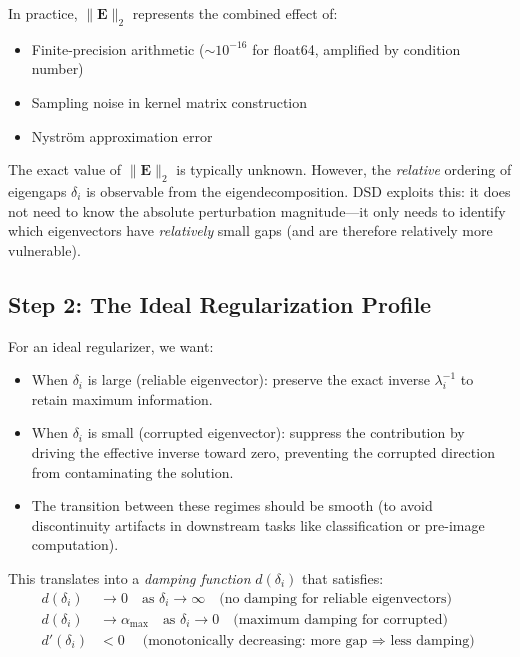 \documentclass[journal]{IEEEtran}
\begin{document}
In practice, $\|\bm{E}\|_2$ represents the combined effect of:
\begin{itemize}
\item Finite-precision arithmetic ($\sim 10^{-16}$ for float64, amplified by condition number)
\item Sampling noise in kernel matrix construction
\item Nystr\"{o}m approximation error
\end{itemize}
The exact value of $\|\bm{E}\|_2$ is typically unknown. However, the \emph{relative} ordering of eigengaps $\delta_i$ is observable from the eigendecomposition. DSD exploits this: it does not need to know the absolute perturbation magnitude---it only needs to identify which eigenvectors have \emph{relatively} small gaps (and are therefore relatively more vulnerable).

\subsection{Step 2: The Ideal Regularization Profile}

For an ideal regularizer, we want:
\begin{itemize}
\item When $\delta_i$ is large (reliable eigenvector): preserve the exact inverse $\lambda_i^{-1}$ to retain maximum information.
\item When $\delta_i$ is small (corrupted eigenvector): suppress the contribution by driving the effective inverse toward zero, preventing the corrupted direction from contaminating the solution.
\item The transition between these regimes should be smooth (to avoid discontinuity artifacts in downstream tasks like classification or pre-image computation).
\end{itemize}

This translates into a \emph{damping function} $d(\delta_i)$ that satisfies:
\begin{align}
d(\delta_i) &\to 0 \quad \text{as } \delta_i \to \infty \quad \text{(no damping for reliable eigenvectors)} \label{eq:req1} \\
d(\delta_i) &\to \alpha_{\max} \quad \text{as } \delta_i \to 0 \quad \text{(maximum damping for corrupted)} \label{eq:req2} \\
d'(\delta_i) &< 0 \quad \text{(monotonically decreasing: more gap $\Rightarrow$ less damping)} \label{eq:req3}
\end{align}
\end{document}
